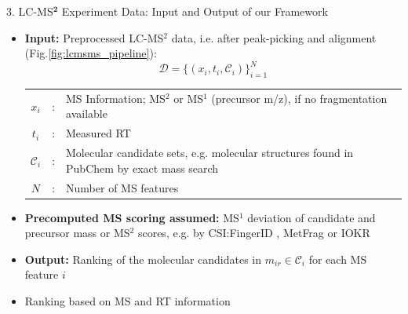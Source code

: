 \documentclass{beamer}
\newcommand{\ms}{MS}
\newcommand{\lc}{LC}
\newcommand{\msone}{\ms$^1$}
\newcommand{\msms}{\ms$^2$}
\newcommand{\lcms}{\lc-\ms}
\newcommand{\lcmsms}{\lc-\msms}
\newcommand{\spec}{x}
\newcommand{\rt}{t}
\newcommand{\cands}{\mathcal{C}}
\newcommand{\seqlength}{N}
\begin{document}
\begin{frame}{}
\begin{columns}[T]
    \begin{block}{{\normalsize 3. \lcms$^\mathbf{2}$ Experiment Data: Input and Output of our Framework}}
    \begin{itemize}
        \item \textbf{Input:} Preprocessed \lcmsms{} data, i.e. after peak-picking and alignment (Fig.\ref{fig:lcmsms_pipeline}):
        \vspace{0.15cm}
            \begin{equation}
                \mathcal{D}=\{(\spec_i,\rt_i,\cands_i)\}_{i=1}^\seqlength
            \end{equation}
        \begin{tabularx}{\textwidth}{ccX}
            $\spec_i$ & : & \ms{} Information; \msms{} or \msone{} (precursor m/z), if no fragmentation available \\
            $\rt_i$ & : & Measured RT \\
            $\cands_i$ & : & {Molecular candidate sets, e.g. molecular structures found in PubChem by \newline exact mass search} \\
            $\seqlength$ & : & Number of \ms{} features   \\
        \end{tabularx}
        \vspace{0.025cm}
        \item \textbf{Precomputed \ms{} scoring assumed:} \msone{} deviation of candidate and precursor mass or \msms{} scores, e.g. by CSI:FingerID \cite{Duehrkop2019}, MetFrag \cite{Ruttkies2016} or IOKR \cite{Brouard_ismb_2016}
        \item \textbf{Output:} Ranking of the molecular candidates in $m_{ir}\in\mathcal{C}_i$ for each \ms{} feature $i$
        \item Ranking based on \ms{} and RT information
    \end{itemize}
    \end{block}



\end{columns}
\end{frame}
\end{document}
